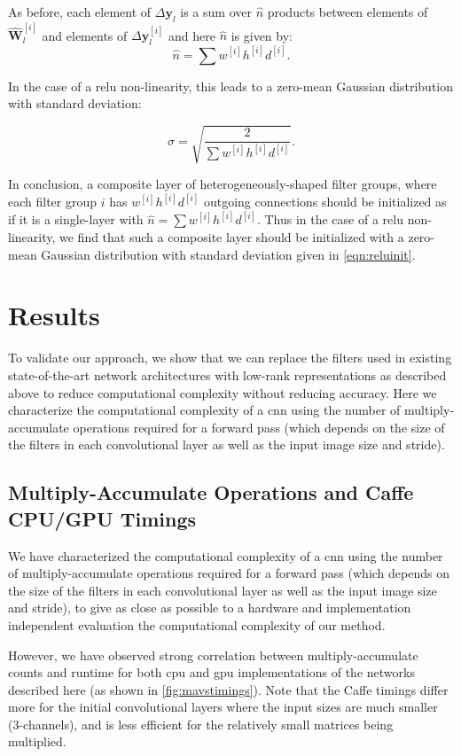 \documentclass[thesis]{subfiles}
\begin{document}
    As before, each element of $\Delta \mathbf{y}_l$ is a sum over $\hat n$ products between elements of $\hat{\mathbf{W}}^{[i]}_l$ and elements of $\Delta \mathbf{y}^{[i]}_l$ and here $\hat{n}$ is given by:
    \begin{equation}
    \hat{n} = \sum{ w^{[i]} h^{[i]} d^{[i]}}.
    \end{equation}
    
    In the case of a \gls{relu} non-linearity, this leads to a zero-mean Gaussian distribution with standard deviation:
    
    \begin{equation}
    \sigma = \sqrt{\frac{2}{\sum{ w^{[i]} h^{[i]} d^{[i]}}}}.\label{eqn:reluinit}
    \end{equation}
    
    In conclusion, a composite layer of heterogeneously-shaped filter groups, where each filter group $i$ has $w^{[i]} h^{[i]} d^{[i]}$ outgoing connections should be initialized as if it is a single-layer with  $\hat{n} = \sum{ w^{[i]} h^{[i]} d^{[i]}}$. Thus in the case of a \gls{relu} non-linearity, we find that such a composite layer should be initialized with a zero-mean Gaussian distribution with standard deviation given in \cref{eqn:reluinit}.
    
    \section{Results}
    To validate our approach, we show that we can replace the filters used in existing state-of-the-art network architectures with low-rank representations as described above to reduce computational complexity without reducing accuracy. Here we characterize the computational complexity of a \gls{cnn} using the number of multiply-accumulate operations required for a forward pass (which depends on the size of the filters in each convolutional layer as well as the input image size and stride).

    \subsection{Multiply-Accumulate Operations and Caffe CPU/GPU Timings}\label{mavstimings}
    We have characterized the computational complexity of a \gls{cnn} using the number of multiply-accumulate operations required for a forward pass (which depends on the size of the filters in each convolutional layer as well as the input image size and stride), to give as close as possible to a hardware and implementation independent evaluation the computational complexity of our method.
    
    However, we have observed strong correlation between multiply-accumulate counts and runtime for both \gls{cpu} and \gls{gpu} implementations of the networks described here (as shown in \cref{fig:mavstimings}). Note that the Caffe timings differ more for the initial convolutional layers where the input sizes are much smaller (3-channels), and  is less efficient for the relatively small matrices being multiplied.
    
\end{document}
